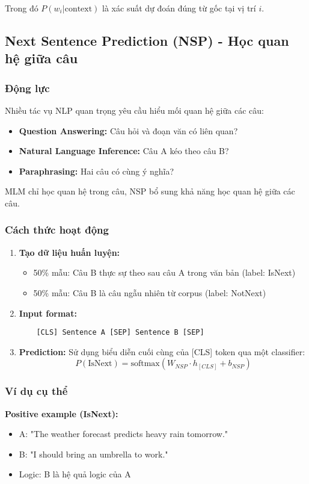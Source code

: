 Trong đó $P(w_i | \text{context})$ là xác suất dự đoán đúng từ gốc tại vị trí $i$.

\subsection{Next Sentence Prediction (NSP) - Học quan hệ giữa câu}
\label{ssec:nsp}

\subsubsection{Động lực}
Nhiều tác vụ NLP quan trọng yêu cầu hiểu mối quan hệ giữa các câu:
\begin{itemize}
    \item \textbf{Question Answering:} Câu hỏi và đoạn văn có liên quan?
    \item \textbf{Natural Language Inference:} Câu A kéo theo câu B?
    \item \textbf{Paraphrasing:} Hai câu có cùng ý nghĩa?
\end{itemize}

MLM chỉ học quan hệ trong câu, NSP bổ sung khả năng học quan hệ giữa các câu.

\subsubsection{Cách thức hoạt động}
\begin{enumerate}
    \item \textbf{Tạo dữ liệu huấn luyện:}
    \begin{itemize}
        \item 50\% mẫu: Câu B thực sự theo sau câu A trong văn bản (label: IsNext)
        \item 50\% mẫu: Câu B là câu ngẫu nhiên từ corpus (label: NotNext)
    \end{itemize}
    
    \item \textbf{Input format:}
    \begin{verbatim}
    [CLS] Sentence A [SEP] Sentence B [SEP]
    \end{verbatim}
    
    \item \textbf{Prediction:} Sử dụng biểu diễn cuối cùng của [CLS] token qua một classifier:
    $$ P(\text{IsNext}) = \text{softmax}(W_{NSP} \cdot h_{[CLS]} + b_{NSP}) $$
\end{enumerate}

\subsubsection{Ví dụ cụ thể}
\textbf{Positive example (IsNext):}
\begin{itemize}
    \item A: "The weather forecast predicts heavy rain tomorrow."
    \item B: "I should bring an umbrella to work."
    \item Logic: B là hệ quả logic của A
\end{itemize}

